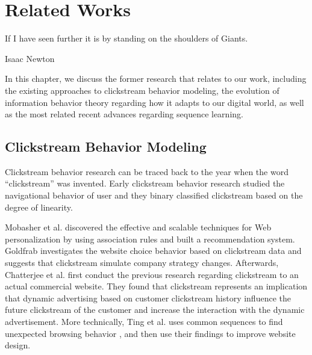 \section{Related Works}
\label{ch:relate}
\epigraph{If I have seen further it is by standing on the shoulders of Giants.}{Isaac Newton}


In this chapter, we discuss the former research that relates to our work, including
the existing approaches to clickstream behavior modeling, the evolution of information 
behavior theory regarding how it adapts to our digital world, as well as the 
most related recent advances regarding sequence learning.

\subsection{Clickstream Behavior Modeling}

Clickstream behavior research can be traced back to the year when the word ``clickstream''
was invented. Early clickstream behavior research studied the navigational behavior
of user \cite{mandese1995clickstreams, brodwin1995} and 
they binary classified clickstream based on the degree of linearity.

Mobasher et al. discovered the effective and scalable techniques \cite{Mobasher:2001:EPB:502932.502935} 
for Web personalization by using association rules and built a recommendation system. 
Goldfrab investigates \cite{goldfarb2002analyzing} the website choice behavior based on 
clickstream data and suggests that clickstream simulate company strategy changes.
Afterwards, Chatterjee et al. \cite{chatterjee2003modeling} first conduct 
the previous research regarding clickstream to an actual commercial website.
They found that clickstream represents an implication that dynamic advertising
based on customer clickstream history influence the future clickstream of the customer
and increase the interaction with the dynamic advertisement.
More technically, Ting et al. uses common sequences to find 
unexpected browsing behavior \cite{Ting:2005:UMF:1092358.1092469},
and then use their findings to improve website design. 

